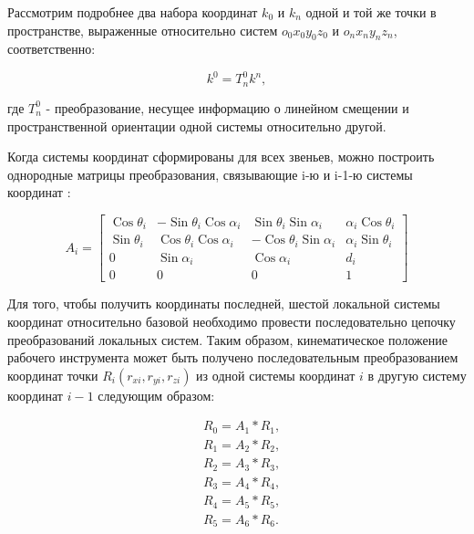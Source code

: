 Рассмотрим подробнее два набора координат $k_{0}$ и $k_{n}$ одной и той же точки в пространстве, выраженные относительно систем $o_{0} x_{0} y_{0} z_{0}$ и $o_{n} x_{n} y_{n} z_{n}$, соответственно:

\begin{equation}
k^{0}=T_{n}^{0} k^{n},
\end{equation}

где $T_{n}^{0}$ - преобразование, несущее информацию о линейном смещении и пространственной ориентации одной системы относительно другой.

Когда системы координат сформированы для всех звеньев, можно построить однородные матрицы преобразования, связывающие i-ю и i-1-ю системы координат \cite{litlink10}:

\begin{equation}
A_{i}=\left[\begin{array}{cccc}
\operatorname{Cos} \theta_{i} & -\operatorname{Sin} \theta_{i} \operatorname{Cos} \alpha_{i} & \operatorname{Sin} \theta_{i} \operatorname{Sin} \alpha_{i} & \alpha_{i} \operatorname{Cos} \theta_{i} \\
\operatorname{Sin} \theta_{i} & \operatorname{Cos} \theta_{i} \operatorname{Cos} \alpha_{i} & -\operatorname{Cos} \theta_{i} \operatorname{Sin} \alpha_{i} & \alpha_{i} \operatorname{Sin} \theta_{i} \\
0 & \operatorname{Sin} \alpha_{i} & \operatorname{Cos} \alpha_{i} & d_{i} \\
0 & 0 & 0 & 1
\end{array}\right]
\end{equation}

Для того, чтобы получить координаты последней, шестой локальной системы координат относительно базовой необходимо провести последовательно цепочку преобразований локальных систем. Таким образом, кинематическое положение рабочего инструмента может быть получено последовательным преобразованием координат точки $R_{i} (r_{xi}, r_{yi}, r_{zi})$ из одной системы координат $i$ в другую систему координат $i-1$ следующим образом:

\begin{equation}
\begin{aligned}
&R_0=A_1*R_1, \\
&R_1=A_2*R_2, \\
&R_2=A_3*R_3, \\
&R_3=A_4*R_4, \\
&R_4=A_5*R_5, \\
&R_5=A_6*R_6.
\end{aligned}
\end{equation}

